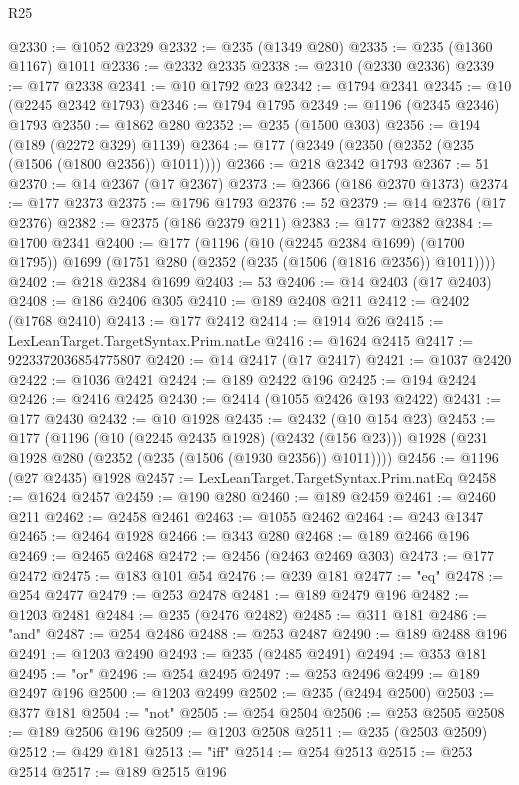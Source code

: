 \begin{lexlean}{R25}
\begin{coremodule}
@2330 := @1052 @2329
@2332 := @235 (@1349 @280)
@2335 := @235 (@1360 @1167) @1011
@2336 := @2332 @2335
@2338 := @2310 (@2330 @2336)
@2339 := @177 @2338
@2341 := @10 @1792 @23
@2342 := @1794 @2341
@2345 := @10 (@2245 @2342 @1793)
@2346 := @1794 @1795
@2349 := @1196 (@2345 @2346) @1793
@2350 := @1862 @280
@2352 := @235 (@1500 @303)
@2356 := @194 (@189 (@2272 @329) @1139)
@2364 := @177 (@2349 (@2350 (@2352 (@235 (@1506 (@1800 @2356)) @1011))))
@2366 := @218 @2342 @1793
@2367 := 51
@2370 := @14 @2367 (@17 @2367)
@2373 := @2366 (@186 @2370 @1373)
@2374 := @177 @2373
@2375 := @1796 @1793
@2376 := 52
@2379 := @14 @2376 (@17 @2376)
@2382 := @2375 (@186 @2379 @211)
@2383 := @177 @2382
@2384 := @1700 @2341
@2400 := @177
    (@1196
      (@10 (@2245 @2384 @1699) (@1700 @1795))
      @1699
      (@1751 @280 (@2352 (@235 (@1506 (@1816 @2356)) @1011))))
@2402 := @218 @2384 @1699
@2403 := 53
@2406 := @14 @2403 (@17 @2403)
@2408 := @186 @2406 @305
@2410 := @189 @2408 @211
@2412 := @2402 (@1768 @2410)
@2413 := @177 @2412
@2414 := @1914 @26
@2415 := LexLeanTarget.TargetSyntax.Prim.natLe
@2416 := @1624 @2415
@2417 := 9223372036854775807
@2420 := @14 @2417 (@17 @2417)
@2421 := @1037 @2420
@2422 := @1036 @2421
@2424 := @189 @2422 @196
@2425 := @194 @2424
@2426 := @2416 @2425
@2430 := @2414 (@1055 @2426 @193 @2422)
@2431 := @177 @2430
@2432 := @10 @1928
@2435 := @2432 (@10 @154 @23)
@2453 := @177
    (@1196
      (@10 (@2245 @2435 @1928) (@2432 (@156 @23)))
      @1928
      (@231 @1928 @280 (@2352 (@235 (@1506 (@1930 @2356)) @1011))))
@2456 := @1196 (@27 @2435) @1928
@2457 := LexLeanTarget.TargetSyntax.Prim.natEq
@2458 := @1624 @2457
@2459 := @190 @280
@2460 := @189 @2459
@2461 := @2460 @211
@2462 := @2458 @2461
@2463 := @1055 @2462
@2464 := @243 @1347
@2465 := @2464 @1928
@2466 := @343 @280
@2468 := @189 @2466 @196
@2469 := @2465 @2468
@2472 := @2456 (@2463 @2469 @303)
@2473 := @177 @2472
@2475 := @183 @101 @54
@2476 := @239 @181
@2477 := "eq"
@2478 := @254 @2477
@2479 := @253 @2478
@2481 := @189 @2479 @196
@2482 := @1203 @2481
@2484 := @235 (@2476 @2482)
@2485 := @311 @181
@2486 := "and"
@2487 := @254 @2486
@2488 := @253 @2487
@2490 := @189 @2488 @196
@2491 := @1203 @2490
@2493 := @235 (@2485 @2491)
@2494 := @353 @181
@2495 := "or"
@2496 := @254 @2495
@2497 := @253 @2496
@2499 := @189 @2497 @196
@2500 := @1203 @2499
@2502 := @235 (@2494 @2500)
@2503 := @377 @181
@2504 := "not"
@2505 := @254 @2504
@2506 := @253 @2505
@2508 := @189 @2506 @196
@2509 := @1203 @2508
@2511 := @235 (@2503 @2509)
@2512 := @429 @181
@2513 := "iff"
@2514 := @254 @2513
@2515 := @253 @2514
@2517 := @189 @2515 @196

\end{coremodule}
\end{lexlean}
